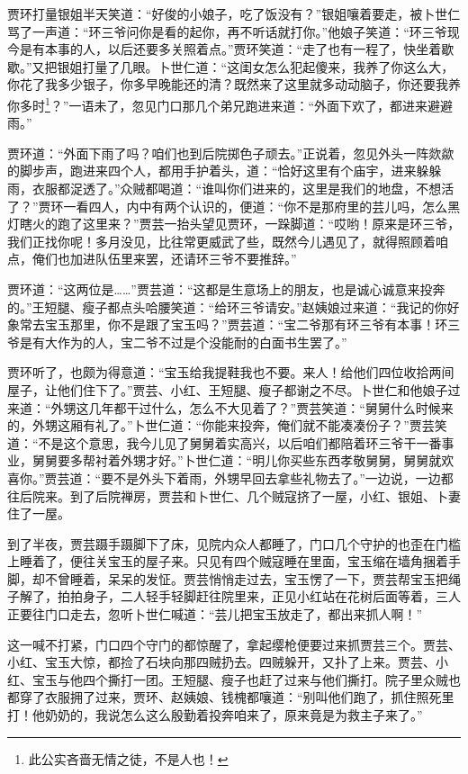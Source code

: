 \documentclass[12pt,oneside]{book}
\begin{document}
贾环打量银姐半天笑道：“好俊的小娘子，吃了饭没有？”银姐嚷着要走，被卜世仁骂了一声道：“环三爷问你是看的起你，再不听话就打你。”他娘子笑道：“环三爷现今是有本事的人，以后还要多关照着点。”贾环笑道：“走了也有一程了，快坐着歇歇。”又把银姐打量了几眼。卜世仁道：“这闺女怎么犯起傻来，我养了你这么大，你花了我多少银子，你多早晚能还的清？既然来了这里就多动动脑子，你还要我养你多时\footnote{此公实吝啬无情之徒，不是人也！}？”一语未了，忽见门口那几个弟兄跑进来道：“外面下欢了，都进来避避雨。”

贾环道：“外面下雨了吗？咱们也到后院掷色子顽去。”正说着，忽见外头一阵欻歘的脚步声，跑进来四个人，都用手护着头，道：“恰好这里有个庙宇，进来躲躲雨，衣服都浞透了。”众贼都喝道：“谁叫你们进来的，这里是我们的地盘，不想活了？”贾环一看四人，内中有两个认识的，便道：“你不是那府里的芸儿吗，怎么黑灯瞎火的跑了这里来？”贾芸一抬头望见贾环，一跺脚道：“哎哟！原来是环三爷，我们正找你呢！多月没见，比往常更威武了些，既然今儿遇见了，就得照顾着咱点，俺们也加进队伍里来罢，还请环三爷不要推辞。”

贾环道：“这两位是……”贾芸道：“这都是生意场上的朋友，也是诚心诚意来投奔的。”王短腿、瘦子都点头哈腰笑道：“给环三爷请安。”赵姨娘过来道：“我记的你好象常去宝玉那里，你不是跟了宝玉吗？”贾芸道：“宝二爷那有环三爷有本事！环三爷是有大作为的人，宝二爷不过是个没能耐的白面书生罢了。”

贾环听了，也颇为得意道：“宝玉给我提鞋我也不要。来人！给他们四位收拾两间屋子，让他们住下了。”贾芸、小红、王短腿、瘦子都谢之不尽。卜世仁和他娘子过来道：“外甥这几年都干过什么，怎么不大见着了？”贾芸笑道：“舅舅什么时候来的，外甥这厢有礼了。”卜世仁道：“你能来投奔，俺们就不能凑凑份子？”贾芸笑道：“不是这个意思，我今儿见了舅舅着实高兴，以后咱们都陪着环三爷干一番事业，舅舅要多帮衬着外甥才好。”卜世仁道：“明儿你买些东西孝敬舅舅，舅舅就欢喜你。”贾芸道：“要不是外头下着雨，外甥早回去拿些礼物去了。”一边说，一边都往后院来。到了后院禅房，贾芸和卜世仁、几个贼寇挤了一屋，小红、银姐、卜妻住了一屋。

到了半夜，贾芸蹑手蹑脚下了床，见院内众人都睡了，门口几个守护的也歪在门槛上睡着了，便往关宝玉的屋子来。只见有四个贼寇睡在里面，宝玉缩在墙角捆着手脚，却不曾睡着，呆呆的发怔。贾芸悄悄走过去，宝玉愣了一下，贾芸帮宝玉把绳子解了，拍拍身子，二人轻手轻脚赶往院里来，正见小红站在花树后面等着，三人正要往门口走去，忽听卜世仁喊道：“芸儿把宝玉放走了，都出来抓人啊！”

这一喊不打紧，门口四个守门的都惊醒了，拿起缨枪便要过来抓贾芸三个。贾芸、小红、宝玉大惊，都捡了石块向那四贼扔去。四贼躲开，又扑了上来。贾芸、小红、宝玉与他四个撕打一团。王短腿、瘦子也赶了过来与他们撕打。院子里众贼也都穿了衣服拥了过来，贾环、赵姨娘、钱槐都嚷道：“别叫他们跑了，抓住照死里打！他奶奶的，我说怎么这么殷勤着投奔咱来了，原来竟是为救主子来了。”
\end{document}
